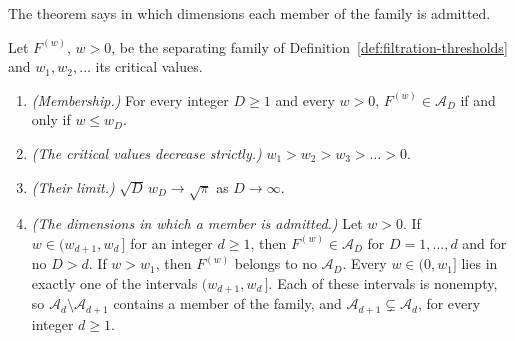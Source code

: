 The theorem says in which dimensions each member of the family is admitted.

\begin{theorem}\label{thm:separating-family-critical-values}
Let $F^{(w)}$, $w > 0$, be the separating family of Definition~\ref{def:filtration-thresholds} and
$w_1, w_2, \dots$ its critical values.
\begin{enumerate}
\item \emph{(Membership.)} For every integer $D \ge 1$ and every $w > 0$,
$F^{(w)} \in \mathcal{A}_D$ if and only if $w \le w_D$.
\item \emph{(The critical values decrease strictly.)} $w_1 > w_2 > w_3 > \dots > 0$.
\item \emph{(Their limit.)} $\sqrt D\,w_D \to \sqrt\pi$ as $D \to \infty$.
\item \emph{(The dimensions in which a member is admitted.)} Let $w > 0$. If
$w \in (w_{d+1}, w_d\,]$ for an integer $d \ge 1$, then $F^{(w)} \in \mathcal{A}_D$ for
$D = 1, \dots, d$ and for no $D > d$. If $w > w_1$, then $F^{(w)}$ belongs to no
$\mathcal{A}_D$. Every $w \in (0, w_1]$ lies in exactly one of the intervals
$(w_{d+1}, w_d\,]$. Each of these intervals is nonempty, so
$\mathcal{A}_d \setminus \mathcal{A}_{d+1}$ contains a member of the family, and
$\mathcal{A}_{d+1} \subsetneq \mathcal{A}_d$, for every integer $d \ge 1$.
\end{enumerate}
\end{theorem}

